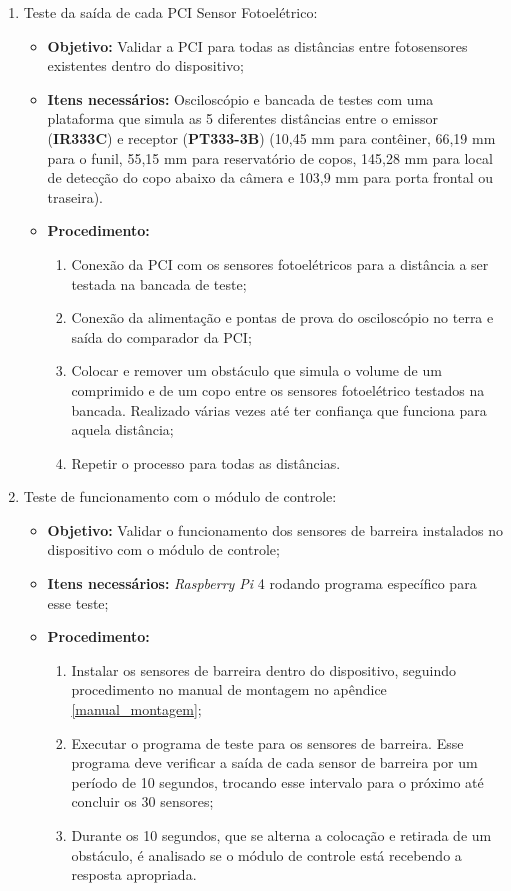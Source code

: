 \begin{enumerate}
    \item Teste da saída de cada PCI Sensor Fotoelétrico:
    
    \begin{itemize}
        \item \textbf{Objetivo:} Validar a PCI para todas as distâncias entre fotosensores existentes dentro do dispositivo;
        \item \textbf{Itens necessários:} Osciloscópio e bancada de testes com uma plataforma que simula as 5 diferentes distâncias entre o emissor (\textbf{IR333C}) e receptor (\textbf{PT333-3B}) (10,45 mm para contêiner, 66,19 mm para o funil, 55,15 mm para reservatório de copos, 145,28 mm para local de detecção do copo abaixo da câmera e 103,9 mm para porta frontal ou traseira).
        \item \textbf{Procedimento:} 
        \begin{enumerate}
            \item Conexão da PCI com os sensores fotoelétricos para a distância a ser testada na bancada de teste;
            \item Conexão da alimentação e pontas de prova do osciloscópio no terra e saída do comparador da PCI;
            \item Colocar e remover um obstáculo que simula o volume de um comprimido e de um copo entre os sensores fotoelétrico testados na bancada. Realizado várias vezes até ter confiança que funciona para aquela distância;
            \item Repetir o processo para todas as distâncias.
        \end{enumerate}
    \end{itemize}
    
    \item Teste de funcionamento com o módulo de controle:
    
    \begin{itemize}
        \item \textbf{Objetivo:} Validar o funcionamento dos sensores de barreira instalados no dispositivo com o módulo de controle;
        \item \textbf{Itens necessários:} \textit{Raspberry Pi} 4 rodando programa específico para esse teste;
        \item \textbf{Procedimento:} 
        \begin{enumerate}
            \item Instalar os sensores de barreira dentro do dispositivo, seguindo procedimento no manual de montagem no apêndice \ref{manual_montagem};
            \item Executar o programa de teste para os sensores de barreira. Esse programa deve verificar a saída de cada sensor de barreira por um período de 10 segundos, trocando esse intervalo para o próximo até concluir os 30 sensores;
            \item Durante os 10 segundos, que se alterna a colocação e retirada de um obstáculo, é analisado se o módulo de controle está recebendo a resposta apropriada.
        \end{enumerate}
    \end{itemize}


\end{enumerate}
